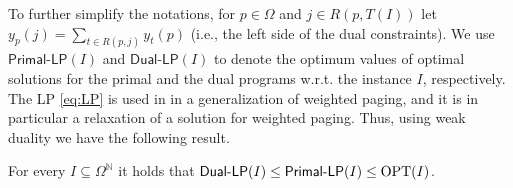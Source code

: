 \documentclass[11pt]{article}
\newcommand{\comment}[1]{}
\newcommand{\OPT}{\textnormal{OPT}}
\newcommand{\om}{{\Omega}}
\begin{document}
{To further simplify the notations, for $p \in \om$ and $j \in R(p,T(I))$ let $y_p(j) = \sum_{t \in R(p,j)} y_t(p)$ (i.e., the left side of the dual constraints). We use $\textsf{Primal-LP}(I)$ and $\textsf{Dual-LP}(I)$ to denote the optimum values of optimal solutions for the primal and the dual programs w.r.t. the instance $I$, respectively. 
The LP \eqref{eq:LP} is used in \cite{bansal2012randomized} in a generalization of weighted paging, and it is in particular a relaxation of a solution for weighted paging. Thus, using weak duality we have the following result. 
	\begin{lemma}
	\label{lem:relaxation}
	For every $I \subseteq \om^{\mathbb{N}}$ it holds that $\textnormal{\textsf{Dual-LP}}(I) \leq \textnormal{\textsf{Primal-LP}}(I) \leq \OPT(I)$. 
\end{lemma}



\comment{
In \cite{bansal2012randomized}, an online deterministic algorithm is presented, which finds an $O(\ln (k))$-competitive feasible (fractional) solution for \eqref{eq:LP} using the online primal-dual method. We use this algorithm here as a black box, where the next result lists the important attributes of the solution obtained in \cite{bansal2012randomized} for our purposes.  

	\begin{lemma}
	\label{lem:fractional}
	Let $I \subseteq \om^{\mathbb{N}}$. There is an algorithm \textnormal{\textsf{Fractional}} that for every $t \in T(I)$ returns a feasible solution $x^t$ for $\textnormal{\textsf{LP}}(I \cap t)$ such that the following holds. 
	\begin{enumerate}
		\item $x^t_{I_t}(r(I_t,t)) = 0$ and $x^t_p(r(p,t))\leq1$ for all $p \in \om, t \in T(I)$. 
		\item $x^t_p(r(p,t)) \geq x^{t-1}_p(r(p,t))$ for all $p \in \om-I_t, t \in T(I)$ (monotonicity). 
		
		\item $x^t_p(j) = x^{t'}_p(j)$ for all $t',t \in T(I), t'<t$, $p \in \om$, $j \in \{0,1,\ldots, r(p,t)-1\}$  (no regrets).   
		\item $\sum_{p \in \om~} \sum_{j \in r(p,T(I))} c(p) \cdot x^{T(I)}_p(j) \leq 2 \cdot \ln (k+1) \cdot \OPT(I)$ (competitive ratio).  
	\end{enumerate}
\end{lemma}



}



}
\end{document}
